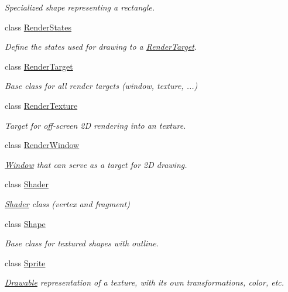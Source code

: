 \begin{DoxyCompactItemize}
\begin{DoxyCompactList}\small\item\em Specialized shape representing a rectangle. \end{DoxyCompactList}\item 
class \hyperlink{classsf_1_1_render_states}{Render\-States}
\begin{DoxyCompactList}\small\item\em Define the states used for drawing to a \hyperlink{classsf_1_1_render_target}{Render\-Target}. \end{DoxyCompactList}\item 
class \hyperlink{classsf_1_1_render_target}{Render\-Target}
\begin{DoxyCompactList}\small\item\em Base class for all render targets (window, texture, ...) \end{DoxyCompactList}\item 
class \hyperlink{classsf_1_1_render_texture}{Render\-Texture}
\begin{DoxyCompactList}\small\item\em Target for off-\/screen 2\-D rendering into an texture. \end{DoxyCompactList}\item 
class \hyperlink{classsf_1_1_render_window}{Render\-Window}
\begin{DoxyCompactList}\small\item\em \hyperlink{classsf_1_1_window}{Window} that can serve as a target for 2\-D drawing. \end{DoxyCompactList}\item 
class \hyperlink{classsf_1_1_shader}{Shader}
\begin{DoxyCompactList}\small\item\em \hyperlink{classsf_1_1_shader}{Shader} class (vertex and fragment) \end{DoxyCompactList}\item 
class \hyperlink{classsf_1_1_shape}{Shape}
\begin{DoxyCompactList}\small\item\em Base class for textured shapes with outline. \end{DoxyCompactList}\item 
class \hyperlink{classsf_1_1_sprite}{Sprite}
\begin{DoxyCompactList}\small\item\em \hyperlink{classsf_1_1_drawable}{Drawable} representation of a texture, with its own transformations, color, etc. \end{DoxyCompactList}\item 

\end{DoxyCompactItemize}
